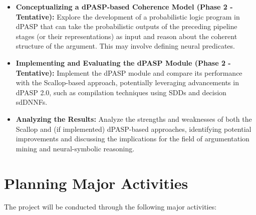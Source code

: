 \documentclass{article}
\begin{document}
\begin{itemize}
    \item \textbf{Conceptualizing a dPASP-based Coherence Model (Phase 2 -
    Tentative):} Explore the development of a probabilistic logic program in
    dPASP that can take the probabilistic outputs of the preceding pipeline
    stages (or their representations) as input and reason about the coherent
    structure of the argument. This may involve defining neural predicates.

    \item \textbf{Implementing and Evaluating the dPASP Module (Phase 2 -
    Tentative):} Implement the dPASP module and compare its performance with
    the Scallop-based approach, potentially leveraging advancements in dPASP
    2.0, such as compilation techniques using SDDs and decision sdDNNFs.

    \item \textbf{Analyzing the Results:} Analyze the strengths and weaknesses
    of both the Scallop and (if implemented) dPASP-based approaches,
    identifying potential improvements and discussing the implications for the
    field of argumentation mining and neural-symbolic reasoning.
\end{itemize}

\section{Planning Major Activities}

The project will be conducted through the following major activities:
\end{document}
